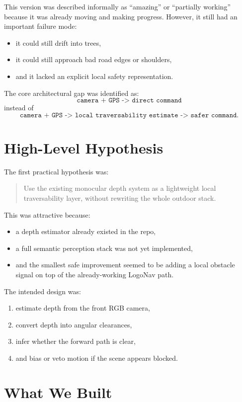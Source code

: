 \documentclass[11pt]{article}
\begin{document}
This version was described informally as ``amazing'' or ``partially working'' because it was already moving and making progress. However, it still had an important failure mode:
\begin{itemize}[leftmargin=*]
\item it could still drift into trees,
\item it could still approach bad road edges or shoulders,
\item and it lacked an explicit local safety representation.
\end{itemize}

The core architectural gap was identified as:
\[
\texttt{camera + GPS -> direct command}
\]
instead of
\[
\texttt{camera + GPS -> local traversability estimate -> safer command}.
\]

\section{High-Level Hypothesis}
The first practical hypothesis was:
\begin{quote}
Use the existing monocular depth system as a lightweight local traversability layer, without rewriting the whole outdoor stack.
\end{quote}

This was attractive because:
\begin{itemize}[leftmargin=*]
\item a depth estimator already existed in the repo,
\item a full semantic perception stack was not yet implemented,
\item and the smallest safe improvement seemed to be adding a local obstacle signal on top of the already-working LogoNav path.
\end{itemize}

The intended design was:
\begin{enumerate}[leftmargin=*]
\item estimate depth from the front RGB camera,
\item convert depth into angular clearances,
\item infer whether the forward path is clear,
\item and bias or veto motion if the scene appears blocked.
\end{enumerate}

\section{What We Built}
\end{document}
